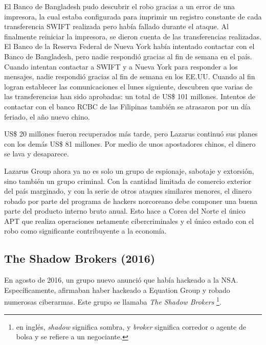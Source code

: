 \documentclass{article}
\begin{document}
El Banco de Bangladesh pudo descubrir el robo gracias a un error de una impresora, la cual estaba configurada para imprimir un registro constante de cada transferencia SWIFT realizada pero había fallado durante el ataque. Al finalmente reiniciar la impresora, se dieron cuenta de las transferencias realizadas. El Banco de la Reserva Federal de Nueva York había intentado contactar con el Banco de Bangladesh, pero nadie respondió gracias al fin de semana en el país. Cuando intentan contactar a SWIFT y a Nueva York para responder a los mensajes, nadie respondió gracias al fin de semana en los EE.UU. Cuando al fin logran establecer las comunicaciones el lunes siguiente, descubren que varias de las transferencias han sido aprobadas: un total de US\$ 101 millones. Intentos de contactar con el banco RCBC de las Filipinas también se atrasaron por un día feriado, el año nuevo chino. \autocite{wired-bangladesh} \autocite{nypost-bangladesh}

US\$ 20 millones fueron recuperados más tarde, pero Lazarus continuó sus planes con los demás US\$ 81 millones. Por medio de unos apostadores chinos, el dinero se lava y desaparece. \autocite{bloomberg-bangladesh}

Lazarus Group ahora ya no es solo un grupo de espionaje, sabotaje y extorsión, sino también un grupo criminal. Con la cantidad limitada de comercio exterior del país marginado, y con la serie de otros ataques similares menores, el dinero robado por parte del programa de hackers norcoreano debe componer una buena parte del producto interno bruto anual. Esto hace a Corea del Norte el único APT que realiza operaciones netamente cibercriminales y el único estado con el robo como significante contribuyente a la economía.


\subsection{The Shadow Brokers (2016)}
En agosto de 2016, un grupo nuevo anunció que había hackeado a la NSA. Específicamente, afirmaban haber hackeado a Equation Group y robado numerosas ciberarmas. Este grupo se llamaba {\it The Shadow Brokers} \footnote{en inglés, {\it shadow} significa sombra, y {\it broker} significa corredor o agente de bolsa y se refiere a un negociante.}.
\end{document}
